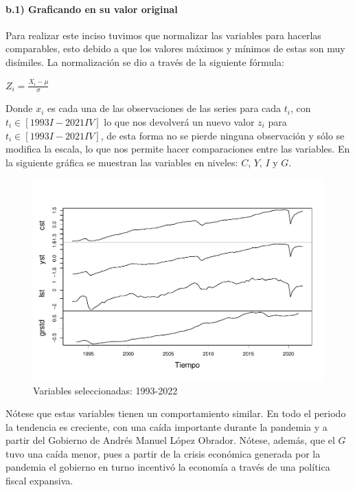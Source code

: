 \documentclass[
]{article}
\begin{document}
\hypertarget{b.1-graficando-en-su-valor-original}{%
\paragraph{b.1) Graficando en su valor
original}\label{b.1-graficando-en-su-valor-original}}

Para realizar este inciso tuvimos que normalizar las variables para
hacerlas comparables, esto debido a que los valores máximos y mínimos de
estas son muy disímiles. La normalización se dio a través de la
siguiente fórmula:

\(Z_i=\frac{X_i- \mu}{\sigma}\)

Donde \(x_i\) es cada una de las observaciones de las series para cada
\(t_i\), con \(t_i \in[1993I-2021IV]\) lo que nos devolverá un nuevo
valor \(z_i\) para \(t_i\in[1993I-2021IV]\), de esta forma no se pierde
ninguna observación y sólo se modifica la escala, lo que nos permite
hacer comparaciones entre las variables. En la siguiente gráfica se
muestran las variables en niveles: \(C\), \(Y\), \(I\) y \(G\).

\begin{figure}
\centering
\includegraphics{Ejercicio-3_files/figure-latex/unnamed-chunk-4-1.pdf}
\caption{Variables seleccionadas: 1993-2022}
\end{figure}

Nótese que estas variables tienen un comportamiento similar. En todo el
periodo la tendencia es creciente, con una caída importante durante la
pandemia y a partir del Gobierno de Andrés Manuel López Obrador. Nótese,
además, que el \(G\) tuvo una caída menor, pues a partir de la crisis
económica generada por la pandemia el gobierno en turno incentivó la
economía a través de una política fiscal expansiva.
\end{document}
